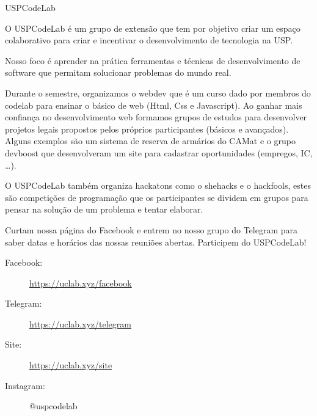 \begin{subsecao}{USPCodeLab}


O USPCodeLab é um grupo de extensão que tem por objetivo criar um espaço
colaborativo para criar e incentivar o desenvolvimento de tecnologia na USP.

Nosso foco é aprender na prática ferramentas e técnicas de desenvolvimento de software que permitam
solucionar problemas do mundo real.

Durante o semestre, organizamos o webdev que é um curso dado por membros do codelab para ensinar o
básico de web (Html, Css e Javascript). Ao ganhar mais confiança no desenvolvimento web formamos
grupos de estudos para desenvolver projetos legais propostos pelos próprios participantes (básicos
e avançados). Alguns exemplos são um sistema de reserva de armários do CAMat e o grupo devboost que
desenvolveram um site para cadastrar oportunidades (empregos, IC, \dots). 

O USPCodeLab também organiza hackatons como o shehacks e o hackfools, estes são competições de
programação que os participantes se dividem em grupos para pensar na solução de um problema e tentar
elaborar.

Curtam nossa página do Facebook e entrem no nosso grupo do Telegram para saber
datas e horários das nossas reuniões abertas. Participem do USPCodeLab!

\begin{description}
\item[Facebook:] \url{https://uclab.xyz/facebook}
\item[Telegram:] \url{https://uclab.xyz/telegram}
\item[Site:] \url{https://uclab.xyz/site}
\item[Instagram:] @uspcodelab
\end{description}

\end{subsecao}
